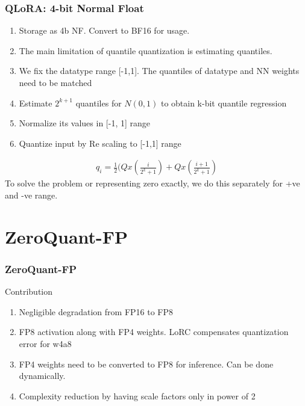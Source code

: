 \documentclass{beamer}
\theoremstyle{plain}
\theoremstyle{definition}
\theoremstyle{remark}
\numberwithin{equation}{section}
\numberwithin{figure}{section}
\numberwithin{theorem}{section}
\begin{document}
\begin{frame}[shrink]
    \frametitle{QLoRA: 4-bit Normal Float}
    \begin{enumerate}
        \item Storage as 4b NF. Convert to BF16 for usage.
        \item The main limitation of quantile quantization is estimating quantiles.
        \item We fix the datatype range [-1,1]. The quantiles of datatype and NN weights need to be matched
        \item Estimate $2^{k+1}$ quantiles for $N(0,1)$ to obtain k-bit quantile regression
        \item Normalize its values in [-1, 1] range
        \item Quantize input by Re scaling to [-1,1] range
    \end{enumerate}                        

    \begin{align}
        q_i = \frac{1}{2} (Qx(\frac{i}{2^k+1}) + Qx(\frac{i+1}{2^k+1})    
    \end{align}
    To solve the problem or representing zero exactly, we do this separately for +ve and -ve range.
\end{frame}                        


\section{ZeroQuant-FP}
\begin{frame}
\frametitle{ZeroQuant-FP}
Contribution
\begin{enumerate}
    \item Negligible degradation from FP16 to FP8
    \item FP8 activation along with FP4 weights. LoRC compensates quantization error for w4a8
    \item FP4 weights need to be converted to FP8 for inference. Can be done dynamically. 
    \item Complexity reduction by having scale factors only in power of 2
\end{enumerate}
\end{frame}
\end{document}
